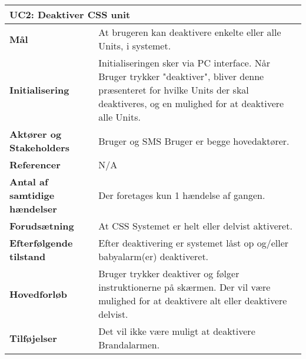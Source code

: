 \begin{table}[H] \centering
\begin{tabular}{|p{6cm}|p{8cm}|}
	\hline
\multicolumn{2}{|l|}{\textbf{UC2: Deaktiver CSS unit}} \\\hline
\textbf{Mål}	&
At brugeren kan deaktivere enkelte eller alle Units, i systemet.
\\\hline
\textbf{Initialisering} &
Initialiseringen sker via PC interface. Når Bruger trykker "deaktiver", bliver denne
præsenteret for hvilke Units der skal deaktiveres, og en mulighed for at deaktivere alle
Units. 
\\\hline
\textbf{Aktører og Stakeholders}	&
Bruger og SMS Bruger er begge hovedaktører.
\\\hline
\textbf{Referencer} &
N/A
\\\hline
\textbf{Antal af samtidige hændelser} &
Der foretages kun 1 hændelse af gangen.
\\\hline
\textbf{Forudsætning} &
At CSS Systemet er helt eller delvist aktiveret.
\\\hline
\textbf{Efterfølgende tilstand} &
Efter deaktivering er systemet låst op og/eller babyalarm(er) deaktiveret.
\\\hline
\textbf{Hovedforløb}	&
Bruger trykker deaktiver og følger instruktionerne på skærmen.
Der vil være mulighed for at deaktivere alt eller deaktivere delvist.
\\\hline
\textbf{Tilføjelser}	&
Det vil ikke være muligt at deaktivere Brandalarmen.
\\\hline
	\end{tabular}
	\label{tab:UC2} 
\end{table}
